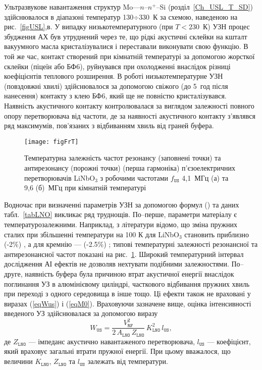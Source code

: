 Ультразвукове навантаження структур Mo---$n$--$n^+$--Si (розділ~\ref{Ch_USL_T_SD}) здійснювалося в діапазоні температур 130$\div$330~К за схемою, наведеною на рис.~\ref{figUSL},в.
У випадку низькотемпературного (при $T<230$~К) УЗН процес збудження АХ був утруднений через те, що
рідкі акустичні склейки на кшталт вакуумного масла кристалізувалися і переставали виконувати свою функцію.
В той же час, контакт створений при кімнатній температурі за допомогою жорсткої склейки (піцеїн або БФ6),
руйнувався при охолодженні внаслідок різниці коефіцієнтів теплового розширення.
В роботі низькотемпературне УЗН (повздовжні хвилі) здійснювалося за допомогою свіжого (до 5~год після нанесення) контакту з клею БФ6,
який ще не повністю кристалізувався.
Наявність акустичного контакту контролювалася за виглядом залежності повного опору перетворювача від частоти,
де за наявності акустичного контакту з'являвся ряд максимумів, пов'язаних з відбиванням хвиль від граней буфера.

\begin{figure}
\center
\texttt{[image: figFrT]}%
\caption{\label{figFrT}
Температурна залежність частот резонансу (заповнені точки) та антирезонансу (порожні точки) (перша гармоніка)
п'єзоелектричних перетворювачів LiNbO$_3$ з робочими частотами $f_\mathtt{US}$ 4,1~МГц (а) та 9,6 (б)~МГц при кімнатній температурі
}
\end{figure}


Водночас при визначенні параметрів УЗН за допомогою формул () та даних табл.~\ref{tabLNO} викликає ряд труднощів.
По--перше, параметри матеріалу є температурозалежними.
Наприклад, з літератури відомо, що зміна пружних сталих при збільшенні температури на 100 К для LiNbO$_3$ становить приблизно (-2\%) \cite{LNO_C:Temp},
а для кремнію --- (-2.5\%) \cite{Si_C:Temp};
типові температурні залежності резонансної та антирезонансної частот показані на рис.~\ref{figFrT}.
Широкий температурний інтервал дослідження АІ ефектів не дозволяв нехтувати подібними залежностями.
По--друге, наявність буфера була причиною втрат акустичної енергії внаслідок поглинання УЗ в алюмінієвому циліндрі, часткового відбивання пружних хвиль
при переході з одного середовища в інше тощо.
Ці ефекти також не враховані у виразах (\ref{eqWus}) і  (\ref{eqM0}).
Враховуючи зазначене вище, оцінка інтенсивності введеного УЗ здійснювалася за допомогою виразу
 \begin{equation}
 \label{eqWus2}
 W_\mathtt{US}=\frac{V_\mathtt{RF}^2}{2\,A_\mathtt{LNO}\,Z_\mathtt{LNO}}\,K_\mathtt{LNO}^2\,l_\mathtt{US},
 \end{equation}
де
$Z_\mathtt{LNO}$ --- імпеданс акустично навантаженого перетворювача,
$l_\mathtt{US}$ --- коефіцієнт, який враховує загальні втрати пружної енергії.
При цьому вважалося, що величини
$K_\mathtt{LNO}$, $Z_\mathtt{LNO}$ та $l_\mathtt{US}$ залежать від температури.

